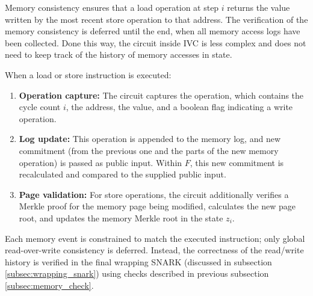 Memory consistency ensures that a load operation at step $i$ returns the value
written by the most recent store operation to that address. The verification of
the memory consistency is deferred until the end, when all memory access logs
have been collected. Done this way, the circuit inside IVC is less complex
and does not need to keep track of the history of memory accesses in state.

When a load or store instruction is executed:

\begin{enumerate}
	\item \textbf{Operation capture:} The circuit captures the operation,
	      which contains the cycle count $i$, the address, the value, and a
	      boolean flag indicating a write operation.
	\item \textbf{Log update:} This operation is appended to the memory log,
	      and new commitment (from the previous one and the parts of the new memory
	      operation) is passed as public input. Within $F$, this new commitment is
	      recalculated and compared to the supplied public input.
	\item \textbf{Page validation:} For store operations, the circuit
	      additionally verifies a Merkle proof for the memory page being
	      modified, calculates the new page root, and updates the memory Merkle
	      root in the state $z_i$.
\end{enumerate}

Each memory event is constrained to match the executed instruction; only global
read-over-write consistency is deferred.
Instead, the correctness of the read/write history is verified in the final
wrapping SNARK (discussed in subsection \ref{subsec:wrapping_snark}) using
checks described in previous subsection \ref{subsec:memory_check}.
